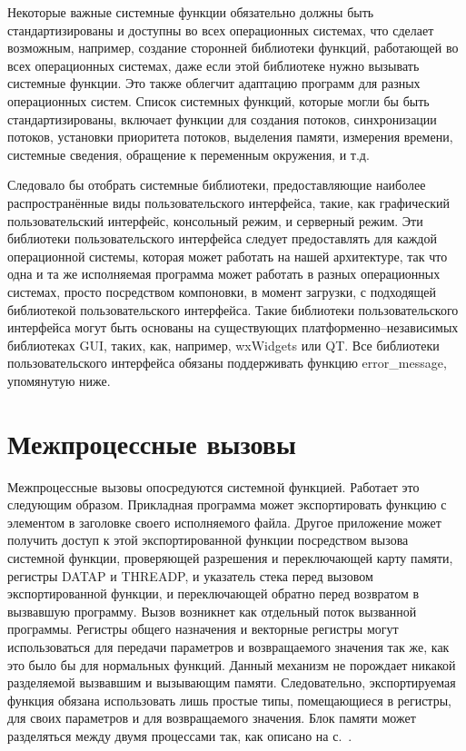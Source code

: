 \documentclass[forwardcom.tex]{subfiles}
\begin{document}
Некоторые важные системные функции обязательно должны быть стандартизированы и доступны во всех операционных системах, что сделает возможным, например, создание сторонней библиотеки функций, работающей во всех операционных системах, даже если этой библиотеке нужно вызывать системные функции. Это также облегчит адаптацию программ для разных операционных систем. Список системных функций, которые могли бы быть стандартизированы, включает функции для создания потоков, синхронизации потоков, установки приоритета потоков, выделения памяти, измерения времени, системные сведения, обращение к переменным окружения, и т.д.

Следовало бы отобрать системные библиотеки, предоставляющие наиболее распространённые виды пользовательского интерфейса, такие, как графический пользовательский интерфейс, консольный режим, и серверный режим. Эти библиотеки пользовательского интерфейса следует предоставлять для каждой операционной системы, которая может работать на нашей архитектуре, так что одна и та же исполняемая программа может работать в разных операционных системах, просто посредством компоновки, в момент загрузки, с подходящей библиотекой пользовательского интерфейса. Такие библиотеки пользовательского интерфейса могут быть основаны на существующих платформенно--независимых библиотеках GUI, таких, как, например, wxWidgets или QT. Все библиотеки пользовательского интерфейса обязаны поддерживать функцию error\_message, упомянутую ниже. 

\section{Межпроцессные вызовы} \label{interProcessCalls}
Межпроцессные вызовы опосредуются системной функцией. Работает это следующим образом. Прикладная программа может экспортировать функцию с элементом в заголовке своего исполняемого файла. Другое приложение может получить доступ к этой экспортированной функции посредством вызова системной функции, проверяющей разрешения и переключающей карту памяти, регистры DATAP и THREADP, и указатель стека перед вызовом экспортированной функции, и переключающей обратно перед возвратом в вызвавшую программу. Вызов возникнет как отдельный поток вызванной программы. Регистры общего назначения и векторные регистры могут использоваться для передачи параметров и возвращаемого значения так же, как это было бы для нормальных функций. Данный механизм не порождает никакой разделяемой вызвавшим и вызывающим памяти. Следовательно, экспортируемая функция обязана использовать лишь простые типы, помещающиеся в регистры, для своих параметров и для возвращаемого значения. Блок памяти может разделяться между двумя процессами так, как описано на с.~\pageref{sharedMemory}. 
\end{document}
